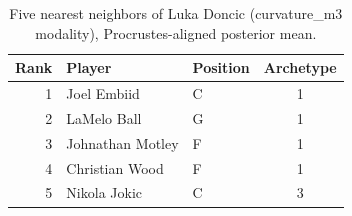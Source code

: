 \begin{table}[htbp]
  \centering\small
  \begin{tabular}{rllc}
    \toprule
    Rank & Player & Position & Archetype \\
    \midrule
    1 & Joel Embiid & C & 1 \\
    2 & LaMelo Ball & G & 1 \\
    3 & Johnathan Motley & F & 1 \\
    4 & Christian Wood & F & 1 \\
    5 & Nikola Jokic & C & 3 \\
    \bottomrule
  \end{tabular}
  \caption{Five nearest neighbors of Luka Doncic (curvature_m3 modality), Procrustes-aligned posterior mean.}
  \label{tab:Luka_Doncic_neighbors_curvature_m3}
\end{table}

